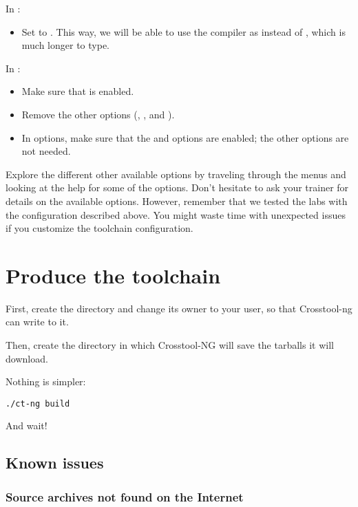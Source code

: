 In :
\begin{itemize}
\item Set  to . This way, we will
  be able to use the compiler as  instead of
  , which is much longer to
  type.
\end{itemize}

In :
\begin{itemize}
\item Make sure that  is enabled.
\item Remove the other options (, ,
       and ).
\item In  options, make sure that the  and
       options are enabled; the other
      options are not needed.
\end{itemize}

Explore the different other available options by traveling through the
menus and looking at the help for some of the options. Don't hesitate
to ask your trainer for details on the available options. However,
remember that we tested the labs with the configuration described
above. You might waste time with unexpected issues if you customize the
toolchain configuration.

\section{Produce the toolchain}

First, create the directory  and change its
owner to your user, so that Crosstool-ng can write to it.

Then, create the directory  in which Crosstool-NG
will save the tarballs it will download.

Nothing is simpler:

\begin{verbatim}
./ct-ng build
\end{verbatim}

And wait!

\subsection{Known issues}

\subsubsection{Source archives not found on the Internet}


